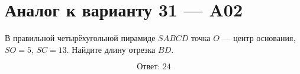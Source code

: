 \documentclass[12pt,a4paper]{article}
\begin{document}
\section*{Аналог к варианту 31 — A02}

В правильной четырёхугольной пирамиде \(SABCD\) точка \(O\) — центр основания, \(SO=5\), \(SC=13\). Найдите длину отрезка \(BD\).

\begin{center}
\end{center}

\[
\boxed{\text{Ответ: }24}
\]
\end{document}
